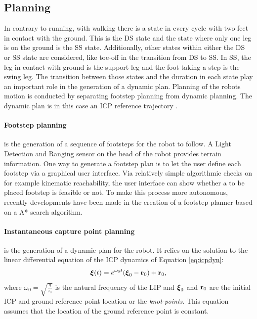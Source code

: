\subsection{Planning}
In contrary to running, with walking there is a state in every cycle with two feet in contact with the ground. This is the \ac{DS} state and the state where only one leg is on the ground is the \ac{SS} state. Additionally, other states within either the \ac{DS} or \ac{SS} state are considered, like toe-off in the transition from \ac{DS} to \ac{SS}. In \ac{SS}, the leg in contact with ground is the support leg and the foot taking a step is the swing leg. The transition between those states and the duration in each state play an important role in the generation of a dynamic plan. Planning of the robots motion is conducted by separating footstep planning from dynamic planning. The dynamic plan is in this case an \ac{ICP} reference trajectory \cite{seyde2018inclusion}.
\paragraph{Footstep planning} is the generation of a sequence of footsteps for the robot to follow. A Light Detection and Ranging sensor on the head of the robot provides terrain information. One way to generate a footstep plan is to let the user define each footstep via a graphical user interface. Via relatively simple algorithmic checks on for example kinematic reachability, the user interface can show whether a to be placed footstep is feasible or not. To make this process more autonomous, recently developments have been made in the creation of a footstep planner based on a A* search algorithm. 
\paragraph{Instantaneous capture point planning}\label{subsec:icpplan} is the generation of a dynamic plan for the robot. It relies on the solution to the linear differential equation of the \ac{ICP} dynamics of Equation \eqref{eq:icpdyn}:
\begin{equation}\label{eq:icpsol}
	\boldsymbol{\xi}(t)=e^{\omega_0t}(\boldsymbol{\xi}_0- \mathbf{r}_0) + \mathbf{r}_0,
\end{equation}
where $\omega_0=\sqrt{\frac{g}{z_0}}$ is the natural frequency of the \ac{LIP} and $\boldsymbol{\xi}_0$ and $\mathbf{r}_0$ are the initial \ac{ICP} and ground reference point location or the \textit{knot-points}. This equation assumes that the location of the ground reference point is constant. 

